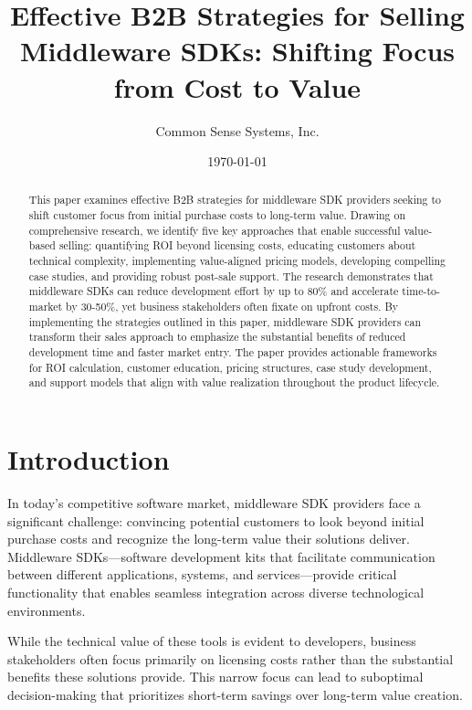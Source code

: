 \documentclass[11pt,a4paper]{article}
\title{\LARGE\textbf{Effective B2B Strategies for Selling Middleware SDKs: Shifting Focus from Cost to Value}}
\author{Common Sense Systems, Inc.}
\date{\today}
\begin{document}
\maketitle
\thispagestyle{fancy}

\begin{abstract}
This paper examines effective B2B strategies for middleware SDK providers seeking to shift customer focus from initial purchase costs to long-term value. Drawing on comprehensive research, we identify five key approaches that enable successful value-based selling: quantifying ROI beyond licensing costs, educating customers about technical complexity, implementing value-aligned pricing models, developing compelling case studies, and providing robust post-sale support. The research demonstrates that middleware SDKs can reduce development effort by up to 80\% and accelerate time-to-market by 30-50\%, yet business stakeholders often fixate on upfront costs. By implementing the strategies outlined in this paper, middleware SDK providers can transform their sales approach to emphasize the substantial benefits of reduced development time and faster market entry. The paper provides actionable frameworks for ROI calculation, customer education, pricing structures, case study development, and support models that align with value realization throughout the product lifecycle.
\end{abstract}

\tableofcontents
\newpage

\section{Introduction}

In today's competitive software market, middleware SDK providers face a significant challenge: convincing potential customers to look beyond initial purchase costs and recognize the long-term value their solutions deliver. Middleware SDKs—software development kits that facilitate communication between different applications, systems, and services—provide critical functionality that enables seamless integration across diverse technological environments.

While the technical value of these tools is evident to developers, business stakeholders often focus primarily on licensing costs rather than the substantial benefits these solutions provide. This narrow focus can lead to suboptimal decision-making that prioritizes short-term savings over long-term value creation.
\end{document}
